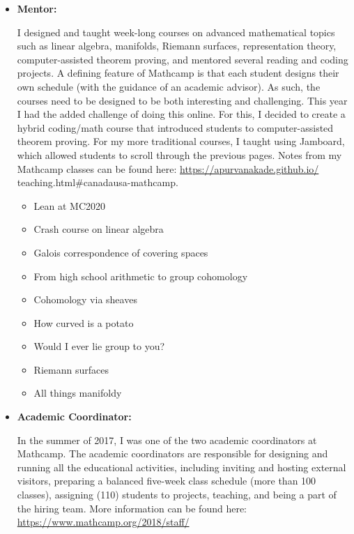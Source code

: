 \documentclass[
]{report}
\providecommand{\tightlist}{%
  \setlength{\itemsep}{0pt}\setlength{\parskip}{0pt}}
\begin{document}
\begin{itemize}
\item
  \textbf{Mentor:}

  I designed and taught week-long courses on advanced mathematical topics such as linear
  algebra, manifolds, Riemann surfaces, representation theory, computer-assisted theorem proving, and
  mentored several reading and coding projects. A defining feature of Mathcamp is that each student
  designs their own schedule (with the guidance of an academic advisor). As such, the courses need to
  be designed to be both interesting and challenging.
  This year I had the added challenge of doing this online. For this, I decided to create a hybrid
  coding/math course that introduced students to computer-assisted theorem proving. For my more
  traditional courses, I taught using Jamboard, which allowed students to scroll through the previous
  pages. Notes from my Mathcamp classes can be found here: \url{https://apurvanakade.github.io/}
  teaching.html\#canadausa-mathcamp.

  \begin{itemize}
  \tightlist
  \item
    Lean at MC2020
  \item
    Crash course on linear algebra
  \item
    Galois correspondence of covering spaces
  \item
    From high school arithmetic to group cohomology
  \item
    Cohomology via sheaves
  \item
    How curved is a potato
  \item
    Would I ever lie group to you?
  \item
    Riemann surfaces
  \item
    All things manifoldy
  \end{itemize}
\item
  \textbf{Academic Coordinator:}

  In the summer of 2017, I was one of the two academic coordinators at Mathcamp.
  The academic coordinators are responsible for designing and running all the educational activities, including inviting and hosting external visitors, preparing a balanced five-week class schedule (more than 100 classes), assigning (110) students to projects, teaching, and being a part of the hiring team.
  More information can be found here: \url{https://www.mathcamp.org/2018/staff/}
\end{itemize}
\end{document}
